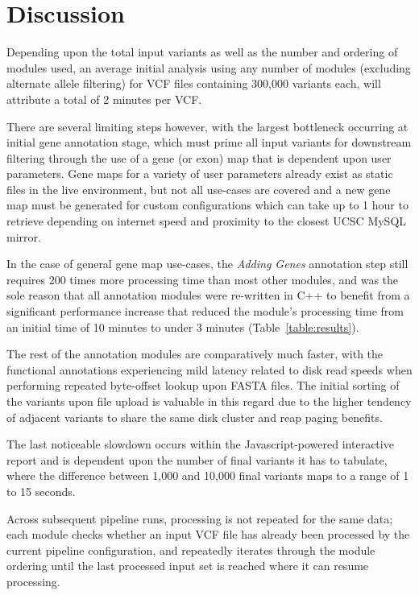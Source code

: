 

\section{Discussion}

Depending upon the total input variants as well as the number and ordering of modules used, an average initial analysis using any number of modules (excluding alternate allele filtering) for VCF files containing 300,000 variants each, will attribute a total of 2 minutes per VCF.

There are several limiting steps however, with the largest bottleneck occurring at initial gene annotation stage, which must prime all input variants for downstream filtering through the use of a gene (or exon) map that is dependent upon user parameters. Gene maps for a variety of user parameters already exist as static files in the live environment, but not all use-cases are covered and a new gene map must be generated for custom configurations which can take up to 1 hour to retrieve depending on internet speed and proximity to the closest UCSC MySQL mirror.

In the case of general gene map use-cases, the \textit{Adding Genes} annotation step still requires 200 times more processing time than most other modules, and was the sole reason that all annotation modules were re-written in C++ to benefit from a significant performance increase that reduced the module's processing time from an initial time of 10 minutes to under 3 minutes (Table~\ref{table:results}). 

The rest of the annotation modules are comparatively much faster, with the functional annotations experiencing mild latency related to disk read speeds when performing repeated byte-offset lookup upon FASTA files. The initial sorting of the variants upon file upload is valuable in this regard due to the higher tendency of adjacent variants to share the same disk cluster and reap paging benefits.

The last noticeable slowdown occurs within the Javascript-powered interactive report and is dependent upon the number of final variants it has to tabulate, where the difference between 1,000 and 10,000 final variants maps to a range of 1 to 15 seconds.

Across subsequent pipeline runs, processing is not repeated for the same data; each module checks whether an input VCF file has already been processed by the current pipeline configuration, and repeatedly iterates through the module ordering until the last processed input set is reached where it can resume processing.




